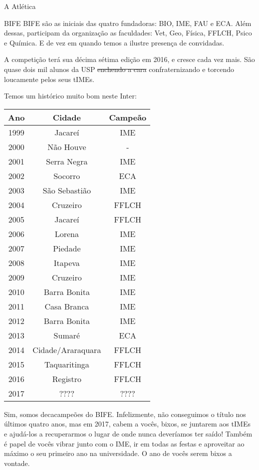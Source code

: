 \begin{secao}{A Atlética}
\begin{subsecao}{BIFE}
BIFE são as iniciais das quatro fundadoras: BIO, IME, FAU e ECA.
Além dessas, participam da organização as faculdades: Vet, Geo, Física, FFLCH,
Psico e Química. E de vez em quando temos a ilustre presença de convidadas.

A competição terá sua décima sétima edição em 2016, e cresce cada vez mais. %
São quase dois mil alunos da USP \sout{enchendo a cara} confraternizando e
torcendo loucamente pelos seus tIMEs.

Temos um histórico muito bom neste Inter:
\begin{center}
	\begin{tabular}{c|c|c}
	  Ano & Cidade & Campeão\\
	  \hline
	  1999 & Jacareí & IME\\
	  2000 & Não Houve & - \\
	  2001 & Serra Negra & IME\\
	  2002 & Socorro & ECA\\
	  2003 & São Sebastião & IME\\
	  2004 & Cruzeiro & FFLCH\\
	  2005 & Jacareí & FFLCH\\
	  2006 & Lorena & IME\\
	  2007 & Piedade & IME\\
	  2008 & Itapeva & IME\\
	  2009 & Cruzeiro & IME\\
	  2010 & Barra Bonita & IME\\
	  2011 & Casa Branca & IME\\
	  2012 & Barra Bonita & IME\\
	  2013 & Sumaré & ECA\\
	  2014 & Cidade/Araraquara & FFLCH\\
	  2015 & Taquaritinga & FFLCH\\
	  2016 & Registro & FFLCH\\
	  2017 & ???? & ????
	\end{tabular}
\end{center}

Sim, somos decacampeões do BIFE.  Infelizmente, não conseguimos o título nos
últimos quatro anos, mas em 2017, cabem a vocês, bixos, se juntarem aos tIMEs e
ajudá-los a recuperarmos o lugar de onde nunca deveríamos ter saído! Também é
papel de vocês vibrar junto com o IME, ir em todas as festas e aproveitar ao máximo o
seu primeiro ano na universidade. O ano de vocês serem bixos a vontade.


\end{subsecao}
\end{secao}
